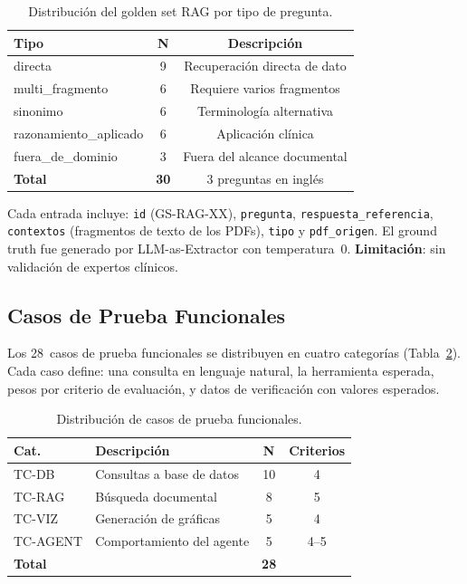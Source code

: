 \documentclass[11pt,a4paper,twocolumn]{article}
\begin{document}
\begin{table}[H]
\centering
\caption{Distribuci\'{o}n del golden set RAG por tipo de pregunta.}
\label{tab:golden_set_rag}
\footnotesize
\begin{tabularx}{\columnwidth}{lcc}
\toprule
\textbf{Tipo} & \textbf{N} & \textbf{Descripci\'{o}n} \\
\midrule
directa              & 9 & Recuperaci\'{o}n directa de dato \\
multi\_fragmento     & 6 & Requiere varios fragmentos \\
sinonimo             & 6 & Terminolog\'{i}a alternativa \\
razonamiento\_aplicado & 6 & Aplicaci\'{o}n cl\'{i}nica \\
fuera\_de\_dominio   & 3 & Fuera del alcance documental \\
\midrule
\textbf{Total} & \textbf{30} & 3 preguntas en ingl\'{e}s \\
\bottomrule
\end{tabularx}
\end{table}

Cada entrada incluye: \texttt{id} (GS-RAG-XX), \texttt{pregunta}, \texttt{respuesta\_referencia}, \texttt{contextos} (fragmentos de texto de los PDFs), \texttt{tipo} y \texttt{pdf\_origen}. El ground truth fue generado por LLM-as-Extractor con temperatura~0. \textbf{Limitaci\'{o}n}: sin validaci\'{o}n de expertos cl\'{i}nicos.

\subsection{Casos de Prueba Funcionales}

Los 28~casos de prueba funcionales se distribuyen en cuatro categor\'{i}as (Tabla~\ref{tab:tc_dist}). Cada caso define: una consulta en lenguaje natural, la herramienta esperada, pesos por criterio de evaluaci\'{o}n, y datos de verificaci\'{o}n con valores esperados.

\begin{table}[H]
\centering
\caption{Distribuci\'{o}n de casos de prueba funcionales.}
\label{tab:tc_dist}
\footnotesize
\begin{tabularx}{\columnwidth}{lXcc}
\toprule
\textbf{Cat.} & \textbf{Descripci\'{o}n} & \textbf{N} & \textbf{Criterios} \\
\midrule
TC-DB    & Consultas a base de datos  & 10 & 4 \\
TC-RAG   & B\'{u}squeda documental     & 8  & 5 \\
TC-VIZ   & Generaci\'{o}n de gr\'{a}ficas & 5  & 4 \\
TC-AGENT & Comportamiento del agente  & 5  & 4--5 \\
\midrule
\textbf{Total} & & \textbf{28} & \\
\bottomrule
\end{tabularx}
\end{table}
\end{document}

